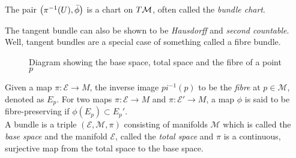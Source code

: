 \begin{lemma}
  The pair $\left( \pi^{-1}(U),\bar{\phi} \right)$ is a chart on $T\mathcal M$, often called the \textit{bundle chart}.
\end{lemma}
The tangent bundle can also be shown to be \textit{Hausdorff} and \textit{second countable}. Well, tangent bundles are a special case of something called a fibre bundle. 
\begin{figure}[H]
  \centering 
  
  \caption{Diagram showing the base space, total space and the fibre of a point $p$}
\end{figure}
\begin{definition}[Bundle]
  Given a map $\pi: \mathcal{E}\rightarrow M$, the inverse image $pi^{-1}(p)$ to be the \textit{fibre} at $p\in \mathcal{M}$, denoted as $E_p$. For two maps $\pi: \mathcal{E}\rightarrow M$ and $\pi: \mathcal{E}'\rightarrow M$, a map $\phi$ is said to be fibre-preserving if $\phi(E_p)\subset E_p'$.\\[0.2cm]
  A bundle is a triple $(\mathcal{E},\mathcal{M},\pi)$ consisting of manifolds $\mathcal{M}$ which is called the \textit{base space} and the manifold $\mathcal{E}$, called the \textit{total space} and $\pi$ is a continuous, surjective map from the total space to the base space.  
\end{definition}

